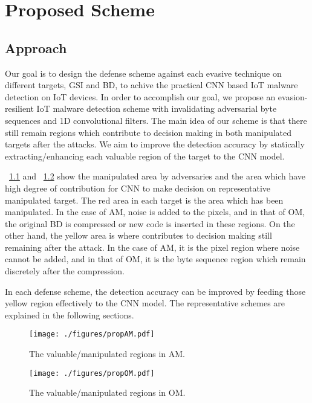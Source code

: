 \chapter{Proposed Scheme}\label{sec:proposed_scheme}

\section{Approach}
Our goal is to design the defense scheme against each evasive technique on different targets, GSI and BD, to achive the practical CNN based IoT malware detection on IoT devices.
In order to accomplish our goal, we propose an evasion-resilient IoT malware detection scheme with invalidating adversarial byte sequences and 1D convolutional filters.  
The main idea of our scheme is that there still remain regions which contribute to decision making in both manipulated targets after the attacks.
We aim to improve the detection accuracy by statically extracting/enhancing each valuable region of the target to the CNN model.

\figurename~\ref{fig:propAM} and \figurename~\ref{fig:propOM} show the manipulated area by adversaries and the area which have high degree of contribution for CNN to make decision on representative manipulated target.
The red area in each target is the area which has been manipulated.
In the case of AM, noise is added to the pixels, and in that of OM, the original BD is compressed or new code is inserted in these regions.
On the other hand, the yellow area is where contributes to decision making still remaining after the attack.
In the case of AM, it is the pixel region where noise cannot be added, and in that of OM, it is the byte sequence region which remain discretely after the compression.

In each defense scheme, the detection accuracy can be improved by feeding those yellow region effectively to the CNN model.
The representative schemes are explained in the following sections.

\begin{figure}[h]
 \centering
 \texttt{[image: ./figures/propAM.pdf]}
 \caption{The valuable/manipulated regions in AM.} 
 \label{fig:propAM}
\end{figure}

\begin{figure}[h]
 \centering
 \texttt{[image: ./figures/propOM.pdf]}
 \caption{The valuable/manipulated regions in OM.} 
 \label{fig:propOM}
\end{figure}

